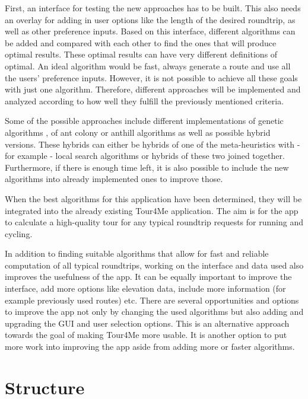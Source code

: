 First, an interface for testing the new approaches has to be built. This also needs an overlay for adding in user options like the length of the desired roundtrip, as well as other preference inputs. 
Based on this interface, different algorithms can be added and compared with each other to find the ones that will produce optimal results.
These optimal results can have very different definitions of optimal. 
An ideal algorithm would be fast, always generate a route and use all the users' preference inputs.
However, it is not possible to achieve all these goals with just one algorithm. 
Therefore, different approaches will be implemented and analyzed according to how well they fulfill the previously mentioned criteria. 

Some of the possible approaches include different implementations of genetic algorithms \cite{gendreauHandbookMetaheuristics2010}, of ant colony or anthill algorithms \cite{babaogluAnthillFrameworkDevelopment2002, gendreauHandbookMetaheuristics2010, wangApplicationAntColony2014} as well as possible hybrid versions.
These hybrids can either be hybrids of one of the meta-heuristics with - for example - local search algorithms \cite{gendreauHandbookMetaheuristics2010, wangApplicationAntColony2014} or hybrids of these two joined together.
Furthermore, if there is enough time left, it is also possible to include the new algorithms into already implemented ones to improve those.

When the best algorithms for this application have been determined, they will be integrated into the already existing Tour4Me application. The aim is for the app to calculate a high-quality tour for any typical roundtrip requests for running and cycling.

In addition to finding suitable algorithms that allow for fast and reliable computation of all typical roundtrips, working on the interface and data used also improves the usefulness of the app.
It can be equally important to improve the interface, add more options like elevation data, include more information (for example previously used routes) etc. 
There are several opportunities and options to improve the app not only by changing the used algorithms but also adding and upgrading the GUI and user selection options.
This is an alternative approach towards the goal of making Tour4Me more usable.
It is another option to put more work into improving the app aside from adding more or faster algorithms.



\section{Structure}
\label{sec:structure}